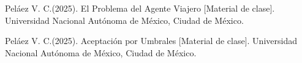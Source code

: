 \begin{thebibliography}{99}

 Peláez V. C.(2025). El Problema del Agente
Viajero [Material de clase]. Universidad Nacional Autónoma de México, Ciudad de México.

 Peláez V. C.(2025). Aceptación por Umbrales [Material de clase]. Universidad Nacional Autónoma de México, Ciudad de México.

\end{thebibliography}
